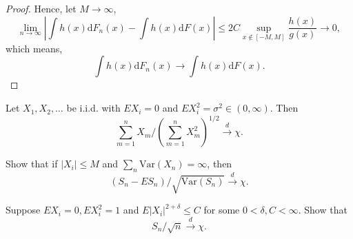 \begin{proof}
	Hence, let $M\rightarrow\infty$,
	\begin{equation*}
		\lim_{n\rightarrow\infty}\left|\int h(x)\mathrm{d}F_{n}(x)-\int h(x)\mathrm{d}F(x)\right| \leq 2C\sup_{x\notin[-M,M]}\frac{h(x)}{g(x)}\rightarrow 0,
	\end{equation*}
	which means,
	\begin{equation*}
		\int h(x)\mathrm{d}F_{n}(x) \rightarrow \int h(x)\mathrm{d}F(x).
	\end{equation*}
\end{proof}

\begin{exercise}
	Let $X_{1},X_{2},\ldots$ be i.i.d. with $EX_{i}=0$ and $EX_{i}^{2}=\sigma^{2}\in(0,\infty)$. Then
	\begin{equation*}
		\sum_{m=1}^{n}X_{m}/\left(\sum_{m=1}^{n}X_{m}^{2}\right)^{1/2}\stackrel{d}{\rightarrow}\chi.
	\end{equation*}
\end{exercise}

\begin{exercise}
	Show that if $\left|X_{i}\right|\leq M$ and $\sum_{n}\text{Var}\left(X_{n}\right)=\infty$, then
	\begin{equation*}
		\left(S_{n}-E S_{n}\right)/\sqrt{\text{Var}\left(S_{n}\right)}\stackrel{d}{\rightarrow}\chi.
	\end{equation*}
\end{exercise}

\begin{exercise}
	Suppose $EX_{i}=0,EX_{i}^{2}=1$ and $E\left|X_{i}\right|^{2+\delta}\leq C$ for some $0<\delta,C<\infty$. Show that
	\begin{equation*}
		S_{n}/\sqrt{n}\stackrel{d}{\rightarrow}\chi.
	\end{equation*}
\end{exercise}
